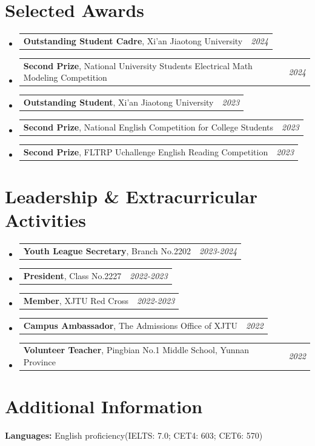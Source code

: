 \documentclass[a4paper,11pt]{article}
\makeatletter
\newcommand{\resumePOR}[3]{
\vspace{-0.2mm}\item
    \begin{tabular*}{0.97\textwidth}[t]{l@{\extracolsep{\fill}}r}
        \textbf{#1}\hspace{0.3mm}#2 & \textit{\small{#3}} 
    \end{tabular*}
    \vspace{-2mm}
}
\newcommand{\resumeProject}[4]{
\vspace{0.5mm}\item
    \begin{tabular*}{0.98\textwidth}[t]{l@{\extracolsep{\fill}}r}
        \textbf{#1} & \textit{\footnotesize{#3}} \\
        \footnotesize{\textit{#2}} & \footnotesize{#4}
    \end{tabular*}
    \vspace{-2.4mm}
}
\newcommand{\resumeSubHeadingListStart}{\begin{itemize}[leftmargin=*,labelsep=1mm]}
\newcommand{\resumeItemListStart}{\begin{itemize}[leftmargin=8mm,labelsep=3mm,itemsep=0.5mm]}
\newcommand{\resumeSubHeadingListEnd}{\end{itemize}\vspace{2mm}}
\newcommand{\resumeItemListEnd}{\end{itemize}\vspace{-2mm}}
\makeatother
\begin{document}




\section{\textbf{Selected Awards}}
\vspace{0.6mm}
\resumeSubHeadingListStart
\resumePOR{Outstanding Student Cadre}
    {, Xi'an Jiaotong University}
    {2024}

\resumePOR
  {Second Prize}
  {, National University Students Electrical Math Modeling Competition}
  {2024}

\resumePOR
  {Outstanding Student}
  {, Xi'an Jiaotong University}
  {2023}

\resumePOR
  {Second Prize}
  {, National English Competition for College Students}
  {2023}

\resumePOR
  {Second Prize}
  {, FLTRP Uchallenge English Reading Competition}
  {2023}

\resumeSubHeadingListEnd
\vspace{-6mm}

\section{\textbf{Leadership \& Extracurricular Activities}}
\vspace{0.6mm}
\resumeSubHeadingListStart
\resumePOR
  {Youth League Secretary}
  {, Branch No.2202}
  {2023-2024}

\resumePOR
  {President}
  {, Class No.2227}
  {2022-2023}

\resumePOR
  {Member}
  {, XJTU Red Cross}
  {2022-2023}

\resumePOR
  {Campus Ambassador}
  {, The Admissions Office of XJTU}
  {2022}

\resumePOR
  {Volunteer Teacher}
  {, Pingbian No.1 Middle School, Yunnan Province}
  {2022}
\resumeSubHeadingListEnd
\vspace{-6mm}


\section{\textbf{Additional Information}}
\vspace{0.6mm}
\textbf{Languages:} English proficiency(IELTS: 7.0; CET4: 603; CET6: 570)
\end{document}
